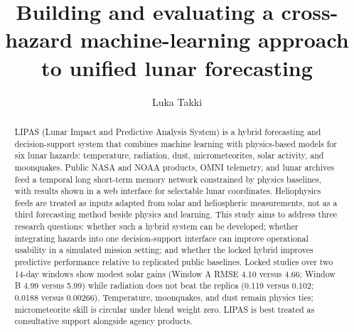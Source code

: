 \documentclass[12pt]{article}
\title{Building and evaluating a cross-hazard machine-learning approach to unified lunar forecasting}
\author{Luka Takki}
\date{}
\begin{document}
\maketitle

\begin{abstract}
LIPAS (Lunar Impact and Predictive Analysis System) is a hybrid forecasting and decision-support system that combines machine learning with physics-based models for six lunar hazards: temperature, radiation, dust, micrometeorites, solar activity, and moonquakes. Public NASA and NOAA products, OMNI telemetry, and lunar archives feed a temporal long short-term memory network constrained by physics baselines, with results shown in a web interface for selectable lunar coordinates. Heliophysics feeds are treated as inputs adapted from solar and heliospheric measurements, not as a third forecasting method beside physics and learning.
This study aims to address three research questions: whether such a hybrid system can be developed; whether integrating hazards into one decision-support interface can improve operational usability in a simulated mission setting; and whether the locked hybrid improves predictive performance relative to replicated public baselines. Locked studies over two 14-day windows show modest solar gains (Window A RMSE 4.10 versus 4.66; Window B 4.99 versus 5.99) while radiation does not beat the replica (0.119 versus 0.102; 0.0188 versus 0.00266). Temperature, moonquakes, and dust remain physics ties; micrometeorite skill is circular under blend weight zero. LIPAS is best treated as consultative support alongside agency products.
\end{abstract}









\end{document}
